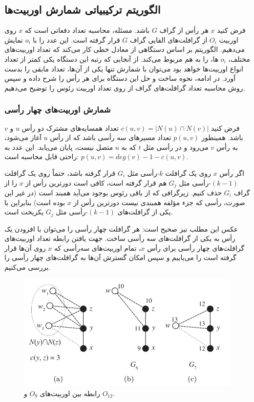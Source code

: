 \subsection{الگوریتم ترکیبیاتی شمارش اوربیت‌ها}
فرض کنید $x$ هر رأس از گراف $G$ باشد. مسئله، محاسبه تعداد دفعاتی است که $x$  روی اوربیت $O_i$ از گرافلت‌های القایی گراف $G$ قرار گرفته است. این عدد را با $o_i$ نمایش می‌دهیم. الگوریتم بر اساس دستگاهی از معادل خطی کار می‌کند که تعداد اوربیت‌های مختلف، $o_i$ ها، را به هم مربوط می‌کند. از آنجایی که رتبه این دستگاه یکی کمتر از تعداد انواع اوربیت‌ها خواهد بود می‌توان با شمارش تنها یکی از آن‌ها، تعداد مابقی را بدست آورد. در ادامه، نحوه ساخت و حل این دستگاه برای هر رأس را شرح داده و سپس روش محاسبه تعداد گرافلت‌های گراف از روی تعداد اوربیت رئوس را توضیح می‌دهیم.

\subsubsection{شمارش اوربیت‌های چهار رأسی}
فرض کنید $c(u,v) = |N(u) \cap N(v)|$ تعداد همسایه‌های مشترک دو رأس $u$ و $v$ باشد. همینطور $p(u,v)$ تعداد مسیرهای سه رأسی باشد که از رأس $u$ آغاز می‌شود، به رأس $v$ می‌رود و در رأسی مثل $t$ که به $u$ متصل نیست، پایان می‌یابد. این عدد به راحتی قابل محاسبه است: 
$p(u,v) = deg(v) -1 -c(u,v)$.

اگر رأس $x$ روی یک گرافلت $k$-رأسی مثل $G_i$ قرار گرفته باشد، حتماً روی یک گرافلت $(k-1)$-رأسی مثل $G_j$ هم قرار گرفته است، کافی است دورترین رأس از $x$ را از گراف $G_i$ حذف کنیم. زیرگرافی که از باقی رئوس بوجود می‌آید همبند است (در غیر این صورت، رأسی که جزء مؤلفه همبندی نیست دورترین رأس از $x$ بوده است) بنابراین با یکی از گرافلت‌های $(k-1)$-رأسی مثل $G_j$ یکریخت است.

عکس این مطلب نیز صحیح است: هر گرافلت چهار رأسی را می‌توان با افزودن یک رأس به یکی از گرافلت‌های سه رأسی ساخت. جهت یافتن رابطه تعداد اوربیت‌های گرافلت‌های چهار رأسی برای رأس $x$، تمام اوربیت‌های سه‌رأسی که $x$ روی آن‌ها قرار گرفته است را می‌یابیم و سپس امکان گسترش آن‌ها به گرافلت‌های چهار رأسی را بررسی می‌کنیم.

\begin{figure}[ht]
\centering
\includegraphics[scale=0.3]{./4-node-graphlet-1.png}
\caption{رابطه بین اوربیت‌های $O_9$ و $O_{12}$.}
\label{fig:o9-o12-relation}
\end{figure}

